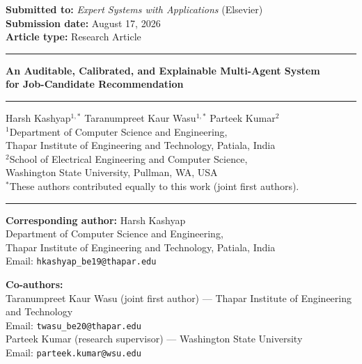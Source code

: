 \documentclass[11pt,a4paper]{article}
\begin{document}
\noindent\textbf{Submitted to:} \textit{Expert Systems with Applications} (Elsevier)\\
\textbf{Submission date:} August 17, 2026\\
\textbf{Article type:} Research Article

\vspace{0.6em}
\hrule
\vspace{0.6em}

\begin{center}
{\Large\bfseries An Auditable, Calibrated, and Explainable Multi-Agent System\\
for Job-Candidate Recommendation}
\end{center}

\vspace{0.5em}
\hrule
\vspace{0.5em}

\begin{center}
{\large
Harsh Kashyap$^{1,*}$ \quad
Taranumpreet Kaur Wasu$^{1,*}$ \quad
Parteek Kumar$^{2}$
}\\[0.4em]
{\normalsize
$^{1}$Department of Computer Science and Engineering,\\
Thapar Institute of Engineering and Technology, Patiala, India\\
$^{2}$School of Electrical Engineering and Computer Science,\\
Washington State University, Pullman, WA, USA
}\\[0.4em]
{\small $^{*}$These authors contributed equally to this work (joint first authors).}
\end{center}

\vspace{0.4em}
\hrule
\vspace{0.5em}

\textbf{Corresponding author:} Harsh Kashyap\\
Department of Computer Science and Engineering,\\
Thapar Institute of Engineering and Technology, Patiala, India\\
Email: \texttt{hkashyap\_be19@thapar.edu}

\vspace{0.3em}
\textbf{Co-authors:}\\
\quad Taranumpreet Kaur Wasu (joint first author) --- Thapar Institute of Engineering and Technology\\
\quad \quad Email: \texttt{twasu\_be20@thapar.edu}\\
\quad Parteek Kumar (research supervisor) --- Washington State University\\
\quad \quad Email: \texttt{parteek.kumar@wsu.edu}
\end{document}
